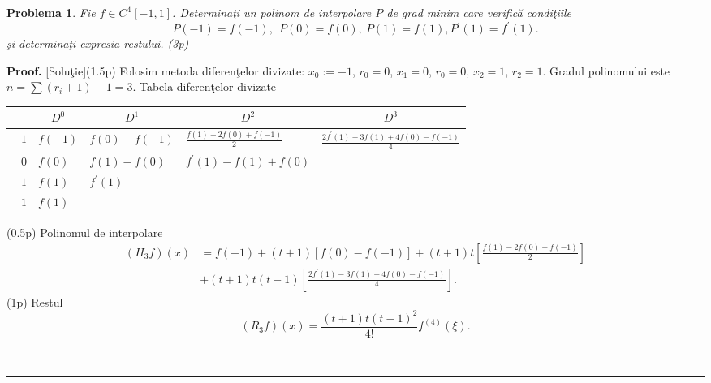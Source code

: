 \documentclass{article}%
\newtheorem{problem}[theorem]{Problema}
\newenvironment{proof}[1][Proof]{\noindent\textbf{#1.} }{\ \rule{0.5em}{0.5em}}
\begin{document}
\begin{problem}
Fie $f\in C^{4}[-1,1]$. Determina\c{t}i un polinom de interpolare $P$ de grad
minim care verific\u{a} condi\c{t}iile
\[
P(-1)=f(-1),~~P(0)=f(0),~P(1)=f(1),P^{\prime}(1)=f^{\prime}(1).
\]
\c{s}i determina\c{t}i expresia restului. (3p)
\end{problem}

\begin{proof}
[Solu\c{t}ie](1.5p) Folosim metoda diferen\c{t}elor divizate: $x_{0}:=-1$,
$r_{0}=0$, $x_{1}=0$, $r_{0}=0$, $x_{2}=1$, $r_{2}=1$. Gradul polinomului este
$n=\sum(r_{i}+1)-1=3$. Tabela diferen\c{t}elor divizate%

\begin{tabular}
[c]{r|cccc}
& $D^{0}$ & $D^{1}$ & $D^{2}$ & $D^{3}$\\\hline
$-1$ & \multicolumn{1}{|l}{$f(-1)$} & \multicolumn{1}{l}{$f(0)-f(-1)$} &
\multicolumn{1}{l}{$\frac{f(1)-2f(0)+f(-1)}{2}$} & \multicolumn{1}{l}{$\frac
{2f^{\prime}(1)-3f(1)+4f(0)-f(-1)}{4}$}\\
$0$ & \multicolumn{1}{|l}{$f(0)$} & \multicolumn{1}{l}{$f(1)-f(0)$} &
\multicolumn{1}{l}{$f^{\prime}(1)-f(1)+f(0)$} & \multicolumn{1}{l}{}\\
$1$ & \multicolumn{1}{|l}{$f(1)$} & \multicolumn{1}{l}{$f^{\prime}(1)$} &
\multicolumn{1}{l}{} & \multicolumn{1}{l}{}\\
$1$ & \multicolumn{1}{|l}{$f(1)$} & \multicolumn{1}{l}{} &
\multicolumn{1}{l}{} & \multicolumn{1}{l}{}%
\end{tabular}


(0.5p) Polinomul de interpolare%
\begin{align*}
\left(  H_{3}f\right)  (x)  &  =f(-1)+(t+1)\left[  f(0)-f(-1)\right]
+(t+1)t\left[  \frac{f(1)-2f(0)+f(-1)}{2}\right] \\
&  +(t+1)t(t-1)\left[  \frac{2f^{\prime}(1)-3f(1)+4f(0)-f(-1)}{4}\right]  .
\end{align*}
(1p) Restul%
\[
\left(  R_{3}f\right)  (x)=\frac{(t+1)t(t-1)^{2}}{4!}f^{(4)}(\xi).
\]

\end{proof}
\end{document}
